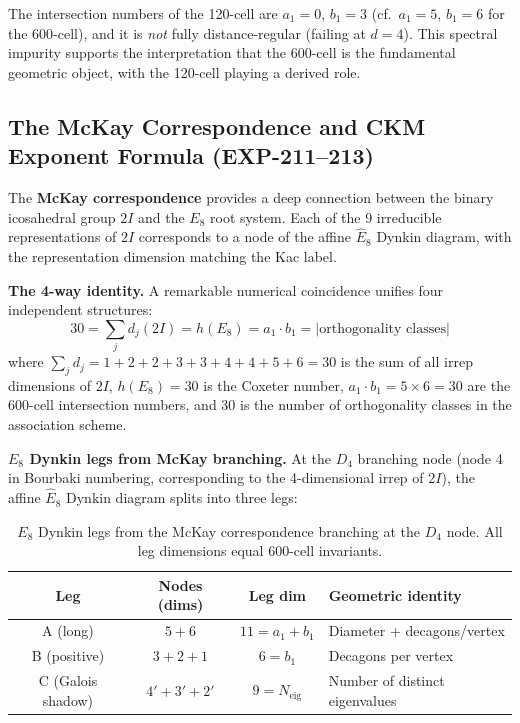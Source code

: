 \documentclass[12pt,a4paper]{article}
\begin{document}
The intersection numbers of the 120-cell are $a_1 = 0$, $b_1 = 3$ (cf.\ $a_1 = 5$, $b_1 = 6$ for the 600-cell), and it is \emph{not} fully distance-regular (failing at $d = 4$). This spectral impurity supports the interpretation that the 600-cell is the fundamental geometric object, with the 120-cell playing a derived role.

\subsection{The McKay Correspondence and CKM Exponent Formula (EXP-211--213)}
\label{sec:mckay}

The \textbf{McKay correspondence} provides a deep connection between the binary icosahedral group $2I$ and the $E_8$ root system. Each of the 9 irreducible representations of $2I$ corresponds to a node of the affine $\hat{E}_8$ Dynkin diagram, with the representation dimension matching the Kac label.

\textbf{The 4-way identity.} A remarkable numerical coincidence unifies four independent structures:
\begin{equation}
\boxed{30 = \sum_{j} d_j(2I) = h(E_8) = a_1 \cdot b_1 = |\text{orthogonality classes}|}
\end{equation}
where $\sum_j d_j = 1+2+2+3+3+4+4+5+6 = 30$ is the sum of all irrep dimensions of $2I$, $h(E_8) = 30$ is the Coxeter number, $a_1 \cdot b_1 = 5 \times 6 = 30$ are the 600-cell intersection numbers, and 30 is the number of orthogonality classes in the association scheme.

\textbf{$E_8$ Dynkin legs from McKay branching.} At the $D_4$ branching node (node 4 in Bourbaki numbering, corresponding to the 4-dimensional irrep of $2I$), the affine $\hat{E}_8$ Dynkin diagram splits into three legs:

\begin{table}[H]
\centering
\begin{tabular}{cccl}
\toprule
\textbf{Leg} & \textbf{Nodes (dims)} & \textbf{Leg dim} & \textbf{Geometric identity} \\
\midrule
A (long) & $5+6$ & $11 = a_1 + b_1$ & Diameter + decagons/vertex \\
B (positive) & $3+2+1$ & $6 = b_1$ & Decagons per vertex \\
C (Galois shadow) & $4'+3'+2'$ & $9 = N_{\text{eig}}$ & Number of distinct eigenvalues \\
\bottomrule
\end{tabular}
\caption{$E_8$ Dynkin legs from the McKay correspondence branching at the $D_4$ node. All leg dimensions equal 600-cell invariants.}
\end{table}
\end{document}
